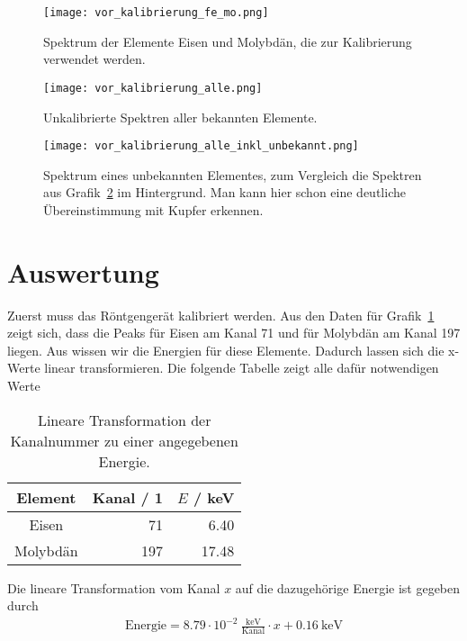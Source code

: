 \documentclass{article}
\begin{document}
\begin{figure}[H]
\texttt{[image: vor\_kalibrierung\_fe\_mo.png]}
\caption{Spektrum der Elemente Eisen und Molybdän, die zur Kalibrierung verwendet werden.}
\label{fig:vor_kalibrierung_fe_mo}

\end{figure}


\begin{figure}[H]
\texttt{[image: vor\_kalibrierung\_alle.png]}
\caption{Unkalibrierte Spektren aller bekannten Elemente.}
\label{fig:vor_kalibrierung_alle}

\end{figure}



\begin{figure}[H]
\texttt{[image: vor\_kalibrierung\_alle\_inkl\_unbekannt.png]}
\caption{Spektrum eines unbekannten Elementes, zum Vergleich die Spektren aus Grafik~\ref{fig:vor_kalibrierung_alle} im Hintergrund. Man kann hier schon eine deutliche Übereinstimmung mit Kupfer erkennen.}
\label{fig:vor_kalibrierung_alle_unbekannt}

\end{figure}

\section{Auswertung}

Zuerst muss das Röntgengerät kalibriert werden. Aus den Daten für Grafik~\ref{fig:vor_kalibrierung_fe_mo} zeigt sich, dass die Peaks für Eisen am Kanal 71 und für Molybdän am Kanal 197 liegen. Aus \cite{moodle} wissen wir die Energien für diese Elemente. Dadurch lassen sich die x-Werte linear transformieren. Die folgende Tabelle zeigt alle dafür notwendigen Werte

\begin{table}[H]
\caption{Lineare Transformation der Kanalnummer zu einer angegebenen Energie.}

\begin{tabular}{c|rr}
Element & Kanal / 1 & $E$ / keV \\
\hline
Eisen & 71 & 6.40 \\
Molybdän & 197 & 17.48 
\end{tabular}
\end{table}

Die lineare Transformation vom Kanal $x$ auf die dazugehörige Energie ist gegeben durch
\begin{align*}
\text{Energie} = 8.79\cdot 10^{-2}~\frac{\text{keV}}{\text{Kanal}}\cdot x + 0.16~\text{keV}
\end{align*}
\end{document}
